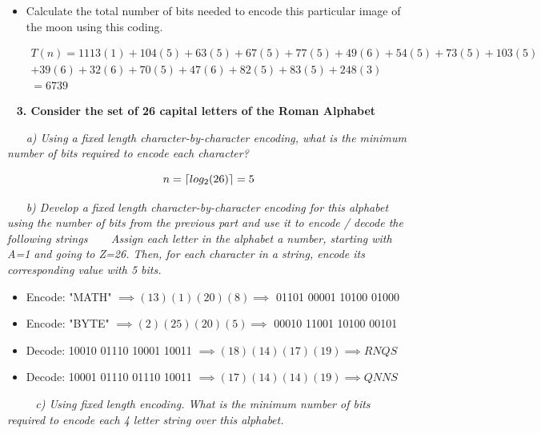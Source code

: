\documentclass[12pt, letterpaper]{article}
\DeclarePairedDelimiter{\ceil}{\lceil}{\rceil}
\begin{document}
\begin{itemize}
\-\ \newline
\item Calculate the total number of bits needed to encode this particular image of the moon using this coding.

\begin{eqnarray*}
T(n) = 1113(1) + 104(5) + 63(5) + 67(5) + 77(5) + 49(6) + 54(5) + 73(5) + 103(5) \\
+ 39(6) + 32(6) + 70(5) + 47(6) + 82(5) + 83(5) + 248(3) \\
= 6739
\end{eqnarray*}

\end{itemize}


\newpage
\-\ \newline
\bf{3. Consider the set of 26 capital letters of the Roman Alphabet}

\-\ \newline
\-\ \it{ a) Using a fixed length character-by-character encoding, what is the minimum number of bits required to encode each character? }

    \[ n = \ceil{ log_2(26) } = 5 \]

\-\ \newline
\-\ \it{ b) Develop a fixed length character-by-character encoding for this alphabet using the number of bits from the previous part and use it to encode / decode the following strings }
\-\ \newline
\-\ \newline
\textnormal{ Assign each letter in the alphabet a number, starting with A=1 and going to Z=26. Then, for each character in a string, encode its corresponding value with 5 bits.  }

\begin{itemize}
\item Encode: "MATH" 
\(\implies (13)(1)(20)(8) \implies\) 01101 00001 10100 01000

\item Encode: "BYTE" 
\( \implies (2)(25)(20)(5) \implies \) 00010 11001 10100 00101

\item Decode: 10010 01110 10001 10011
\( \implies (18)(14)(17)(19) \implies RNQS\)

\item Decode: 10001 01110 01110 10011 
\( \implies (17)(14)(14)(19) \implies QNNS\)
\end{itemize}

\-\ \newline
\-\ \newline
\-\ \it{ c) Using fixed length encoding. What is the minimum number of bits required to encode each 4 letter string over this alphabet. }
\end{document}
